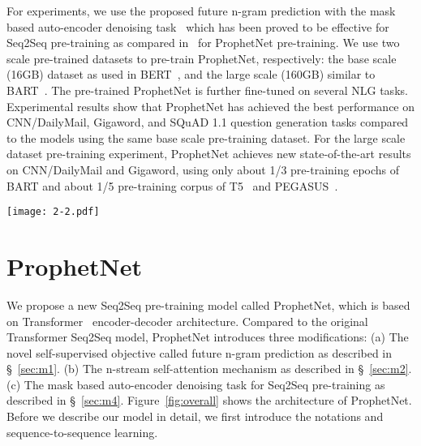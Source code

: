 \documentclass[11pt,a4paper]{article}
\begin{document}
For experiments, we use the proposed future n-gram prediction with the mask based auto-encoder denoising task~\cite{song2019mass,lewis2019bart} which has been proved to be effective for Seq2Seq pre-training as compared in~\citet{raffel2019exploring} for ProphetNet pre-training.  
We use two scale pre-trained datasets to pre-train ProphetNet, respectively: the base scale (16GB) dataset as used in BERT~\cite{devlin2018bert}, and the large scale (160GB) similar to BART~\cite{lewis2019bart}. 
The pre-trained ProphetNet is further fine-tuned on several NLG tasks.
Experimental results show that ProphetNet has achieved the best performance on CNN/DailyMail, Gigaword, and SQuAD 1.1 question generation tasks compared to the models using the same base scale pre-training dataset. 
For the large scale dataset pre-training experiment, ProphetNet achieves new state-of-the-art results on CNN/DailyMail and Gigaword, using only about 1/3 pre-training epochs of BART and about 1/5 pre-training corpus of T5~\cite{raffel2019exploring} and PEGASUS~\cite{zhang2019pegasus}.

\begin{figure*}[th]
    \centering
	\texttt{[image: 2-2.pdf]}
	\caption{The architecture of ProphetNet. For simplicity, we take bigram ($n=2$) as an example to introduce ProphetNet, whose modeling target is $p(y_{t}, y_{t+1}|y_{<t}, x)$ for each time step. The left part shows the encoder of the ProphetNet which is the same as the original Transformer encoder. The right part presents the decoder of the ProphetNet which incorporates the proposed n-stream self-attention.
	For Seq2Seq pre-training, we present the example of inputs and outputs of the mask based auto-encoder denoising task. The token ``\_'' represents the mask symbol [$\mathbb{M}$]. Note that each $x_i$ and $y_i$ are the same in this task. The layer normalization and residual connection are ignored.}\label{fig:overall}
\end{figure*}

\section{ProphetNet}
We propose a new Seq2Seq pre-training model called ProphetNet, which is based on Transformer~\cite{vaswani2017attention} encoder-decoder architecture. Compared to the original Transformer Seq2Seq model, ProphetNet introduces three modifications: 
(a) The novel self-supervised objective called future n-gram prediction as described in \S~\ref{sec:m1}. 
(b) The n-stream self-attention mechanism as described in \S~\ref{sec:m2}.
(c) The mask based auto-encoder denoising task for Seq2Seq pre-training as described in \S~\ref{sec:m4}.
Figure~\ref{fig:overall} shows the architecture of ProphetNet.
Before we describe our model in detail, we first introduce the notations and sequence-to-sequence learning. 
 
\end{document}
